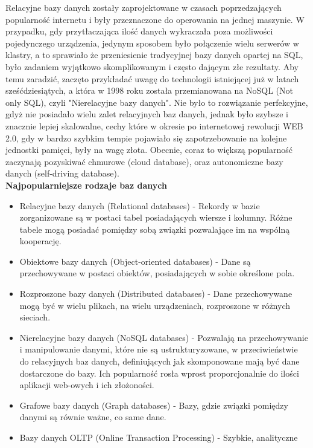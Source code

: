\documentclass[12pt, a4paper]{article}
\begin{document}
\begin{sloppypar}
{{    Relacyjne bazy danych zostały zaprojektowane w czasach poprzedzających popularność
    internetu i były przeznaczone do operowania na jednej maszynie. W przypadku, gdy
    przytłaczająca ilość danych wykraczała poza możliwości pojedynczego urządzenia, jedynym
    sposobem było połączenie wielu serwerów w klastry, a to sprawiało że przeniesienie
    tradycyjnej bazy danych opartej na SQL, było zadaniem wyjątkowo skomplikowanym i często
    dającym złe rezultaty.
    Aby temu zaradzić, zaczęto przykładać uwagę do technologii istniejącej już w latach
    sześćdziesiątych, a która w 1998 roku została przemianowana na NoSQL (Not only SQL),
    czyli "Nierelacyjne bazy danych".
    Nie było to rozwiązanie perfekcyjne, gdyż nie posiadało wielu zalet relacyjnych baz
    danych, jednak było szybsze i znacznie lepiej skalowalne, cechy które w okresie po
    internetowej rewolucji WEB 2.0, gdy w bardzo szybkim tempie pojawiało się zapotrzebowanie
    na kolejne jednostki pamięci, były na wagę złota. Obecnie, coraz to większą popularność
    zaczynają pozyskiwać chmurowe (cloud database), oraz autonomiczne bazy danych
    (self-driving database).\\
    {\large \bfseries Najpopularniejsze rodzaje baz danych} \cite{oracle-db}
    \begin{itemize}
      \item Relacyjne bazy danych (Relational databases) - Rekordy w bazie zorganizowane
      są w postaci tabel posiadających wiersze i kolumny. Różne tabele mogą posiadać
      pomiędzy sobą związki pozwalające im na wspólną kooperację. 
      \item Obiektowe bazy danych (Object-oriented databases) - Dane są przechowywane w
      postaci obiektów, posiadających w sobie określone pola.
      \item Rozproszone bazy danych (Distributed databases) - Dane przechowywane mogą być
      w wielu plikach, na wielu urządzeniach, rozproszone w różnych sieciach.
      \item Nierelacyjne bazy danych (NoSQL databases) - Pozwalają na przechowywanie i
      manipulowanie danymi, które nie są ustrukturyzowane, w przeciwieństwie do relacyjnych
      baz danych, definiujących jak skomponowane mają być dane dostarczone do bazy. Ich
      popularność rosła wprost proporcjonalnie do ilości aplikacji web-owych i ich
      złożoności.
      \item Grafowe bazy danych (Graph databases) - Bazy, gdzie związki pomiędzy
      danymi są równie ważne, co same dane.
      \item Bazy danych OLTP (Online Transaction Processing) - Szybkie, analityczne

\end{itemize}}}
\end{sloppypar}
\end{document}
